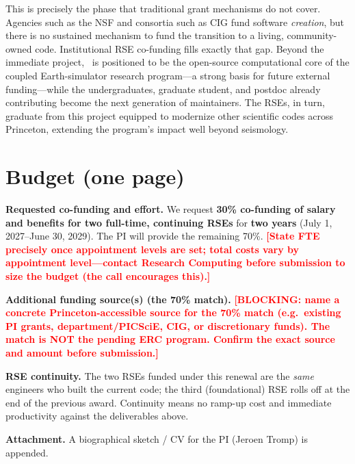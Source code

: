 \documentclass[11pt,letter]{article}
\newcommand{\note}[1]{\textbf{\textcolor{Red}{[#1]}}}
\begin{document}
This is precisely the phase that traditional grant mechanisms do not cover. Agencies such as the NSF and consortia such as CIG fund software \emph{creation}, but there is no sustained mechanism to fund the transition to a living, community-owned code. Institutional RSE co-funding fills exactly that gap. Beyond the immediate project, \SFPP\ is positioned to be the open-source computational core of the coupled Earth-simulator research program---a strong basis for future external funding---while the undergraduates, graduate student, and postdoc already contributing become the next generation of maintainers. The RSEs, in turn, graduate from this project equipped to modernize other scientific codes across Princeton, extending the program's impact well beyond seismology.

\newpage
\section*{Budget (one page)}
\noindent\textbf{Requested co-funding and effort.} We request \textbf{30\% co-funding of salary and benefits for two full-time, continuing RSEs} for \textbf{two years} (July 1, 2027--June 30, 2029). The PI will provide the remaining 70\%.
\note{State FTE precisely once appointment levels are set; total costs vary by appointment level---contact Research Computing before submission to size the budget (the call encourages this).}

\vspace{0.4em}
\noindent\textbf{Additional funding source(s) (the 70\% match).} \note{BLOCKING: name a concrete Princeton-accessible source for the 70\% match (e.g.\ existing PI grants, department/PICSciE, CIG, or discretionary funds). The match is NOT the pending ERC program. Confirm the exact source and amount before submission.}

\vspace{0.4em}
\noindent\textbf{RSE continuity.} The two RSEs funded under this renewal are the \emph{same} engineers who built the current code; the third (foundational) RSE rolls off at the end of the previous award. Continuity means no ramp-up cost and immediate productivity against the deliverables above.

\vspace{0.4em}
\noindent\textbf{Attachment.} A biographical sketch / CV for the PI (Jeroen Tromp) is appended.
\end{document}
